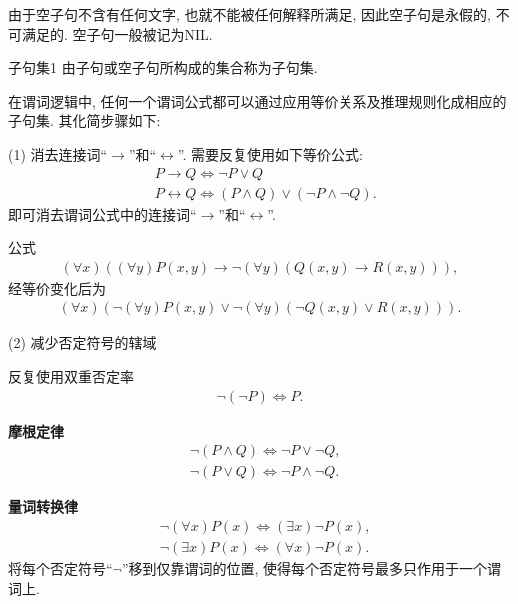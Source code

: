  由于空子句不含有任何文字, 也就不能被任何解释所满足, 因此空子句是永假的, 不可满足的.
空子句一般被记为NIL.

\begin{mydef}{子句集}{1}
   由子句或空子句所构成的集合称为子句集.
\end{mydef}


在谓词逻辑中, 任何一个谓词公式都可以通过应用等价关系及推理规则化成相应的子句集. 其化简步骤如下:

(1) 消去连接词“$\rightarrow$”和“$\longleftrightarrow$”. 需要反复使用如下等价公式:
\begin{align}
    &P\rightarrow Q \Leftrightarrow \neg  P\vee Q\\
    &P\longleftrightarrow Q \Leftrightarrow  (P\wedge Q)\vee (\neg P\wedge \neg Q).
\end{align}
即可消去谓词公式中的连接词“$\rightarrow$”和“$\longleftrightarrow$”.

\begin{example}公式
\begin{align}
  (\forall x)((\forall y)P(x,y)\rightarrow \neg  (\forall y)(Q(x,y)\rightarrow R(x,y))),
\end{align}
经等价变化后为
\begin{align}
  (\forall x)(\neg (\forall y)P(x,y)\vee \neg  (\forall y)(\neg Q(x,y)\vee R(x,y))).
\end{align}
\end{example}

(2) 减少否定符号的辖域

反复使用双重否定率
\begin{align}
  \neg (\neg P) \Leftrightarrow  P.
\end{align}

\textbf{摩根定律}
\begin{align}
 &\neg (P\wedge Q) \Leftrightarrow \neg P\vee \neg Q,\\
 &\neg (P\vee Q) \Leftrightarrow \neg P\wedge \neg Q.
\end{align}

\textbf{量词转换律}
\begin{align}
  &\neg  (\forall x)P(x) \Leftrightarrow  (\exists  x) \neg P(x),\\
  &\neg  (\exists  x)P(x) \Leftrightarrow  (\forall x)\neg P(x).
\end{align}
将每个否定符号“$\neg$”移到仅靠谓词的位置, 使得每个否定符号最多只作用于一个谓词上.

